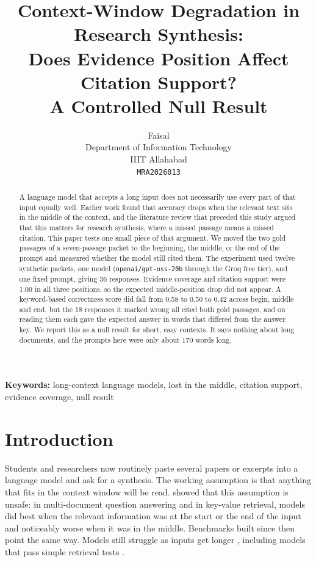 \documentclass[11pt,a4paper]{article}
\title{Context-Window Degradation in Research Synthesis:\\
Does Evidence Position Affect Citation Support?\\
A Controlled Null Result}
\author{
  Faisal\\
  Department of Information Technology\\
  IIIT Allahabad\\
  \texttt{MRA2026013}
}
\date{}
\begin{document}
\maketitle

\begin{abstract}
A language model that accepts a long input does not necessarily use every part of that input equally well.
Earlier work found that accuracy drops when the relevant text sits in the middle of the context,
and the literature review that preceded this study argued that this matters for research synthesis, where a missed passage means a missed citation.
This paper tests one small piece of that argument.
We moved the two gold passages of a seven-passage packet to the beginning, the middle, or the end of the prompt
and measured whether the model still cited them.
The experiment used twelve synthetic packets, one model (\texttt{openai/gpt-oss-20b} through the Groq free tier),
and one fixed prompt, giving 36 responses.
Evidence coverage and citation support were 1.00 in all three positions, so the expected middle-position drop did not appear.
A keyword-based correctness score did fall from 0.58 to 0.50 to 0.42 across begin, middle and end,
but the 18 responses it marked wrong all cited both gold passages,
and on reading them each gave the expected answer in words that differed from the answer key.
We report this as a null result for short, easy contexts.
It says nothing about long documents, and the prompts here were only about 170 words long.
\end{abstract}

\noindent\textbf{Keywords:} long-context language models, lost in the middle, citation support, evidence coverage, null result

\section{Introduction}
\label{sec:intro}

Students and researchers now routinely paste several papers or excerpts into a language model and ask for a synthesis.
The working assumption is that anything that fits in the context window will be read.
\citet{liu2024lost} showed that this assumption is unsafe: in multi-document question answering and in key-value retrieval,
models did best when the relevant information was at the start or the end of the input and noticeably worse when it was in the middle.
Benchmarks built since then point the same way.
Models still struggle as inputs get longer \citep{bai2024longbench},
including models that pass simple retrieval tests \citep{hsieh2024ruler}.
\end{document}
